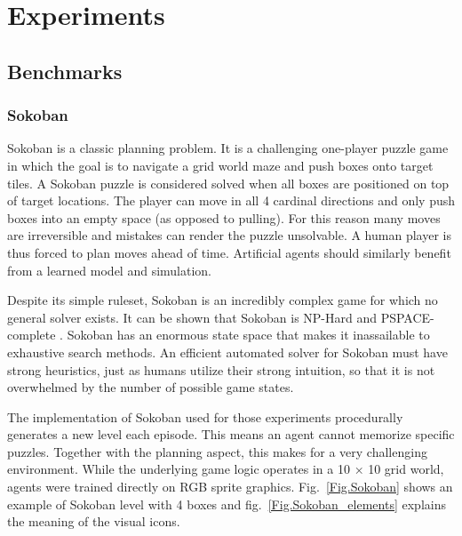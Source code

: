 \section{Experiments}

\subsection{Benchmarks}

\subsubsection{Sokoban}

Sokoban is a classic planning problem. It is a challenging one-player puzzle game in which the goal is to navigate a grid world maze and push boxes onto target tiles. A Sokoban puzzle is considered solved when all boxes are positioned on top of target locations. The player can move in all 4 cardinal directions and only push boxes into an empty space (as opposed to pulling). For this reason many moves are irreversible and mistakes can render the puzzle unsolvable. A human player is thus forced to plan moves ahead of time. Artificial agents should similarly benefit from a learned model and simulation.

Despite its simple ruleset, Sokoban is an incredibly complex game for which no general solver exists. It can be shown that Sokoban is NP-Hard and PSPACE-complete \cite{Benchmark.Sokoban} . Sokoban has an enormous state space that makes it inassailable to exhaustive search methods. An efficient automated solver for Sokoban must have strong heuristics, just as humans utilize their strong intuition, so that it is not overwhelmed by the number of possible game states.

The implementation of Sokoban\cite{Code.Sokoban} used for those experiments procedurally generates a new level each episode. This means an agent cannot memorize specific puzzles. Together with the planning aspect, this makes for a very challenging environment. While the underlying game logic operates in a 10 × 10 grid world, agents were trained directly on RGB sprite graphics. Fig.~\ref{Fig.Sokoban} shows an example of Sokoban level with 4 boxes and fig.~\ref{Fig.Sokoban_elements} explains the meaning of the visual icons.


